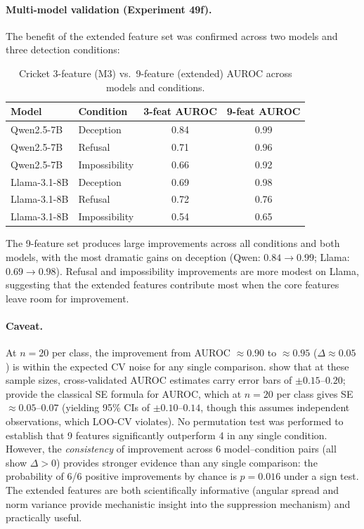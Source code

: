 \paragraph{Multi-model validation (Experiment 49f).} The benefit of the extended feature set was confirmed across two models and three detection conditions:

\begin{table}[H]
\centering
\caption{Cricket 3-feature (M3) vs.\ 9-feature (extended) AUROC across models and conditions.}
\label{tab:extended_multimodel}
\begin{tabular}{llcc}
\toprule
\textbf{Model} & \textbf{Condition} & \textbf{3-feat AUROC} & \textbf{9-feat AUROC} \\
\midrule
Qwen2.5-7B & Deception & 0.84 & 0.99 \\
Qwen2.5-7B & Refusal & 0.71 & 0.96 \\
Qwen2.5-7B & Impossibility & 0.66 & 0.92 \\
\midrule
Llama-3.1-8B & Deception & 0.69 & 0.98 \\
Llama-3.1-8B & Refusal & 0.72 & 0.76 \\
Llama-3.1-8B & Impossibility & 0.54 & 0.65 \\
\bottomrule
\end{tabular}
\end{table}

The 9-feature set produces large improvements across all conditions and both models, with the most dramatic gains on deception (Qwen: $0.84 \to 0.99$; Llama: $0.69 \to 0.98$). Refusal and impossibility improvements are more modest on Llama, suggesting that the extended features contribute most when the core features leave room for improvement.

\paragraph{Caveat.} At $n = 20$ per class, the improvement from AUROC $\approx 0.90$ to $\approx 0.95$ ($\Delta \approx 0.05$) is within the expected CV noise for any single comparison. \citet{varoquaux2018cross} show that at these sample sizes, cross-validated AUROC estimates carry error bars of $\pm 0.15$--$0.20$; \citet{hanley1982meaning} provide the classical SE formula for AUROC, which at $n = 20$ per class gives SE $\approx 0.05$--$0.07$ (yielding 95\% CIs of $\pm 0.10$--$0.14$, though this assumes independent observations, which LOO-CV violates). No permutation test was performed to establish that 9 features significantly outperform 4 in any single condition. However, the \emph{consistency} of improvement across 6 model--condition pairs (all show $\Delta > 0$) provides stronger evidence than any single comparison: the probability of 6/6 positive improvements by chance is $p = 0.016$ under a sign test. The extended features are both scientifically informative (angular spread and norm variance provide mechanistic insight into the suppression mechanism) and practically useful.
